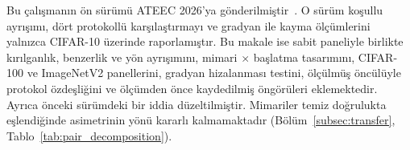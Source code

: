 Bu çalışmanın ön sürümü ATEEC 2026'ya gönderilmiştir~\cite{sahin2026behavioral}. O sürüm koşullu ayrışımı, dört protokollü karşılaştırmayı ve gradyan ile kayma ölçümlerini yalnızca CIFAR-10 üzerinde raporlamıştır. Bu makale ise sabit paneliyle birlikte kırılganlık, benzerlik ve yön ayrışımını, mimari $\times$ başlatma tasarımını, CIFAR-100 ve ImageNetV2 panellerini, gradyan hizalanması testini, ölçülmüş öncülüyle protokol özdeşliğini ve ölçümden önce kaydedilmiş öngörüleri eklemektedir. Ayrıca önceki sürümdeki bir iddia düzeltilmiştir. Mimariler temiz doğrulukta eşlendiğinde asimetrinin yönü kararlı kalmamaktadır (Bölüm~\ref{subsec:transfer}, Tablo~\ref{tab:pair_decomposition}).

